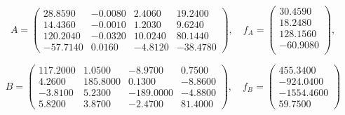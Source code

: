 \documentclass[12pt, a4paper]{article}
\begin{document}
\[
    A = 
    \begin{pmatrix}
     28.8590    &    -0.0080    &     2.4060    &    19.2400    \\   
     14.4360    &    -0.0010    &     1.2030    &     9.6240    \\   
    120.2040    &    -0.0320    &    10.0240    &    80.1440    \\  
    -57.7140    &     0.0160    &    -4.8120    &   -38.4780       

    \end{pmatrix}, \quad f_{A} = 
    \begin{pmatrix}
    30.4590  \\
    18.2480  \\
    128.1560 \\
    -60.9080 \\
    \end{pmatrix},
\]

\[
    B = 
    \begin{pmatrix}
        117.2000 &    1.0500   &    -8.9700 &    0.7500 \\
        4.2600  &    185.8000   &   0.1300 &   -8.8600  \\
        -3.8100  &    5.2300  &  -189.0000  &  -4.8800  \\
        5.8200  &      3.8700  &   -2.4700   &    81.4000   
    \end{pmatrix}, \quad f_{B} = 
    \begin{pmatrix}
       455.3400 \\
       -924.0400  \\
      -1554.4600  \\
        59.7500
    \end{pmatrix}
\]

\newpage
\end{document}
